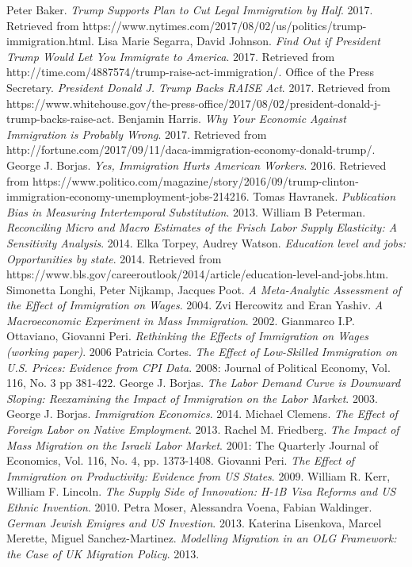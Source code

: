 \documentclass[11pt]{article}
\begin{document}
\begin{thebibliography}{1}
   Peter Baker. {\em Trump Supports Plan to Cut Legal Immigration by Half}. 2017. Retrieved from https://www.nytimes.com/2017/08/02/us/politics/trump-immigration.html.
   Lisa Marie Segarra, David Johnson. {\em Find Out if President Trump Would Let You Immigrate to America}. 2017. Retrieved from http://time.com/4887574/trump-raise-act-immigration/.
   Office of the Press Secretary. {\em President Donald J. Trump Backs RAISE Act}. 2017. Retrieved from https://www.whitehouse.gov/the-press-office/2017/08/02/president-donald-j-trump-backs-raise-act.
   Benjamin Harris. {\em Why Your Economic Against Immigration is Probably Wrong}. 2017. Retrieved from http://fortune.com/2017/09/11/daca-immigration-economy-donald-trump/.
   George J. Borjas. {\em Yes, Immigration Hurts American Workers}. 2016. Retrieved from https://www.politico.com/magazine/story/2016/09/trump-clinton-immigration-economy-unemployment-jobs-214216.
   Tomas Havranek. {\em Publication Bias in Measuring Intertemporal Substitution}. 2013.
   William B Peterman. {\em Reconciling Micro and Macro Estimates of the Frisch Labor Supply Elasticity: A Sensitivity Analysis}. 2014.
   Elka Torpey, Audrey Watson. {\em Education level and jobs: Opportunities by state}. 2014. Retrieved from https://www.bls.gov/careeroutlook/2014/article/education-level-and-jobs.htm.
   Simonetta Longhi, Peter Nijkamp, Jacques Poot. {\em A Meta-Analytic Assessment of the Effect of Immigration on Wages}. 2004.
   Zvi Hercowitz and Eran Yashiv. {\em A Macroeconomic Experiment in Mass Immigration}. 2002.
   Gianmarco I.P. Ottaviano, Giovanni Peri. {\em Rethinking the Effects of Immigration on Wages (working paper)}. 2006
   Patricia Cortes. {\em The Effect of Low-Skilled Immigration on U.S. Prices: Evidence from CPI Data}. 2008: Journal of Political Economy, Vol. 116, No. 3 pp 381-422.
   George J. Borjas. {\em The Labor Demand Curve is Downward Sloping: Reexamining the Impact of Immigration on the Labor Market}. 2003.
   George J. Borjas. {\em Immigration Economics}. 2014.
   Michael Clemens. {\em The Effect of Foreign Labor on Native Employment}. 2013.
   Rachel M. Friedberg. {\em The Impact of Mass Migration on the Israeli Labor Market}. 2001: The Quarterly Journal of Economics, Vol. 116, No. 4, pp. 1373-1408.
   Giovanni Peri. {\em The Effect of Immigration on Productivity: Evidence from US States}. 2009.
   William R. Kerr, William F. Lincoln. {\em The Supply Side of Innovation: H-1B Visa Reforms and US Ethnic Invention}. 2010.
   Petra Moser, Alessandra Voena, Fabian Waldinger. {\em German Jewish Emigres and US Investion}. 2013.
   Katerina Lisenkova, Marcel Merette, Miguel Sanchez-Martinez. {\em Modelling Migration in an OLG Framework: the Case of UK Migration Policy}. 2013.
\end{thebibliography}
\end{document}
